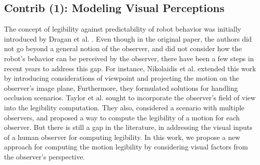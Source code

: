     \subsection{Contrib (1): Modeling Visual Perceptions}
    The concept of legibility against predictability of robot behavior was initially introduced by Dragan et al. \cite{dragan2013legibility}.
    Even though in the original paper, the authors did not go beyond a general notion of the observer, and did not consider
    how the robot's behavior can be perceived by the observer, there have been a few steps in recent years to address this gap.
    For instance, Nikolaidis et al. \cite{nikolaidis2016based} extended this work by introducing considerations of viewpoint and projecting the motion on the observer's image plane,
    Furthermore, they formulated solutions for handling occlusion scenarios.
    Taylor et al. \cite{taylor2018human} sought to incorporate the observer's field of view into the legibility computation.
    They also, considered a scenario with multiple observers, and proposed a way to compute the legibility of a motion for each observer.
    But there is still a gap in the literature, in addressing the visual inputs of a human observer for computing legibility.
    In this work, we propose a new approach for computing the motion legibility by considering visual factors from the observer's perspective.

